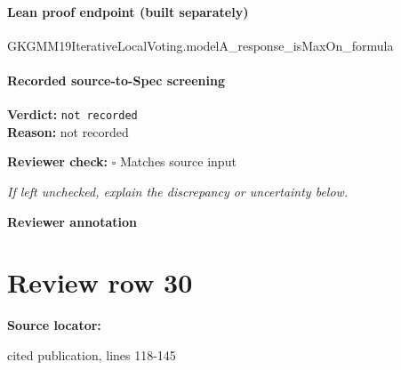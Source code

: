\documentclass[10pt]{article}
\newcommand{\reviewerbox}{%
  \par\noindent\fbox{\parbox{0.96\linewidth}{\rule{0pt}{0.38in}}}\par
}
\newcommand{\reviewmatch}[1]{%
  \par\noindent\textbf{Reviewer check:} $\square$\; #1\par
  \noindent\emph{If left unchecked, explain the discrepancy or uncertainty below.}\par
}
\begin{document}
\paragraph{Lean proof endpoint (built separately)}\begin{ReviewVerbatim}
GKGMM19IterativeLocalVoting.modelA_response_isMaxOn_formula
\end{ReviewVerbatim}

\paragraph{Recorded source-to-Spec screening}
\textbf{Verdict:} \texttt{not recorded}
\\
\textbf{Reason:} not recorded
\reviewmatch{Matches source input}
\noindent\textbf{Reviewer annotation}\par
\reviewerbox
\clearpage
\hypertarget{source-claim-eab2a66508b56f30}{}
\section*{Review row 30}
\textbf{Source locator:} {\footnotesize\raggedright cited publication, lines 118-\allowbreak{}145\par}
\end{document}
